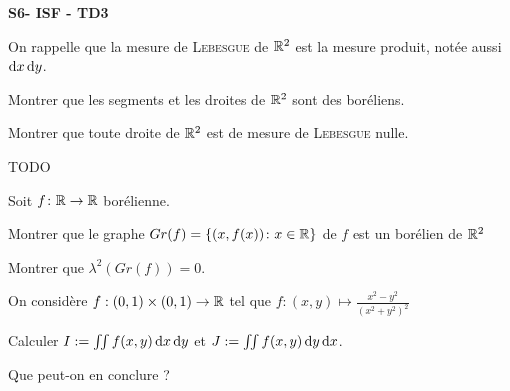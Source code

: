 \documentclass[french]{report}
\begin{document}
\begin{center}
    \huge{\textbf{S6- ISF - TD3}}
\end{center}


\begin{exo}
    On rappelle que la mesure de \textsc{Lebesgue} de \(\mathbb{R}^2\) est la mesure
    produit, notée aussi \(\mathop{}\!\mathrm{d} x\mathop{}\!\mathrm{d} y\).
    \begin{q}{1}
        Montrer que les segments et les droites de \(\mathbb{R}^2\) sont des boréliens.
    \end{q}
    \begin{q}{2}
        Montrer que toute droite de \(\mathbb{R}^2\) est de mesure de \textsc{Lebesgue} nulle.
    \end{q}
\end{exo}

\begin{exo}
    TODO
\end{exo}

\begin{exo}
    Soit \(f\colon\mathbb{R}\to\mathbb{R}\) borélienne.
    \begin{q}{1}
        Montrer que le graphe \(Gr(f)=\{(x,f(x))\colon x\in\mathbb{R}\}\) de \(f\) est un borélien
        de \(\mathbb{R}^2\)
    \end{q}
    \begin{q}{2}
        Montrer que \(\lambda^2(Gr(f))=0\).
    \end{q}
\end{exo}

\begin{exo}
    On considère \(f:(0,1)\times(0,1)\to \mathbb{R}\) tel que \(f:(x,y)\mapsto
    \frac{x^2-y^2}{(x^2+y^2)^2}\)
    \begin{q}{1}
        Calculer \(I:=\iint f(x,y)\mathop{}\!\mathrm{d} x\mathop{}\!\mathrm{d} y\) et \(J:=\iint f(x,y)\mathop{}\!\mathrm{d} y\mathop{}\!\mathrm{d} x\).
    \end{q}
    \begin{q}{2}
        Que peut-on en conclure ?
    \end{q}
\end{exo}
\end{document}
